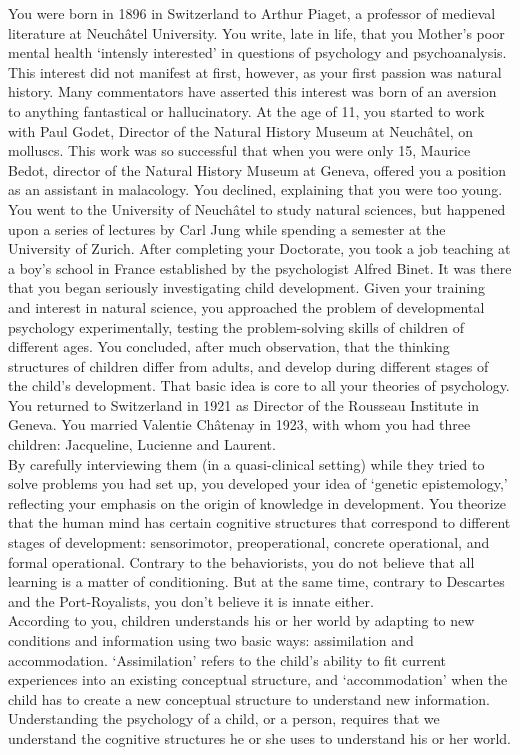 You were born in 1896 in Switzerland to Arthur Piaget, a professor of medieval literature at Neuchâtel University. You write, late in life, that you Mother's poor mental health `intensly interested' in questions of psychology and psychoanalysis. This interest did not manifest at first, however, as your first passion was natural history. Many commentators have asserted this interest was born of an aversion to anything fantastical or hallucinatory. At the age of 11, you started to work with Paul Godet, Director of the Natural History Museum at Neuchâtel, on molluscs. This work was so successful that when you were only 15, Maurice Bedot, director of the Natural History Museum at Geneva, offered you a position as an assistant in malacology. You declined, explaining that you were too young.
You went to the University of Neuchâtel to study natural sciences, but happened upon a series of lectures by Carl Jung while spending a semester at the University of Zurich. After completing your Doctorate, you took a job teaching at a boy's school in France established by the psychologist Alfred Binet. It was there that you began seriously investigating child development.
Given your training and interest in natural science, you approached the problem of developmental psychology experimentally, testing the problem-solving skills of children of different ages. You concluded, after much observation, that the thinking structures of children differ from adults, and develop during different stages of the child's development. That basic idea is core to all your theories of psychology.
You returned to Switzerland in 1921 as Director of the Rousseau Institute in Geneva. You married Valentie Châtenay in 1923, with whom you had three children: Jacqueline, Lucienne and Laurent.\\
By carefully interviewing them (in a quasi-clinical setting) while they tried to solve problems you had set up, you developed your idea of `genetic epistemology,' reflecting your emphasis on the origin of knowledge in development. You theorize that the human mind has certain cognitive structures that correspond to different stages of development: sensorimotor, preoperational, concrete operational, and formal operational. Contrary to the behaviorists, you do not believe that all learning is a matter of conditioning. But at the same time, contrary to Descartes and the Port-Royalists, you don't believe it is innate either.\\
According to you, children understands his or her world by adapting to new conditions and information using two basic ways: assimilation and accommodation. `Assimilation' refers to the child's ability to fit current experiences into an existing conceptual structure, and `accommodation' when the child has to create a new conceptual structure to understand new information. Understanding the psychology of a child, or a person, requires that we understand the cognitive structures he or she uses to understand his or her world.
